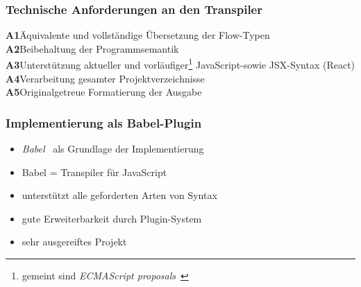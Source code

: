     \begin{frame}
      \frametitle{Technische Anforderungen an den Transpiler}
      \textbf{A1}\hspace{0.75em}Äquivalente und vollständige Übersetzung der Flow-Typen\\[.6em]
      \textbf{A2}\hspace{0.75em}Beibehaltung der Programmsemantik\\[.6em]
      \textbf{A3}\hspace{0.75em}Unterstützung aktueller und vorläufiger\footnote{gemeint sind \textit{ECMAScript proposals}~\autocite{ES_PROPOSALS}} JavaScript-\secframebr sowie JSX-Syntax (React)\\[.6em]
      \textbf{A4}\hspace{0.75em}Verarbeitung gesamter Projektverzeichnisse\\[.6em]
      \textbf{A5}\hspace{0.75em}Originalgetreue Formatierung der Ausgabe
    \end{frame}


    \begin{frame}
      \frametitle{Implementierung als Babel-Plugin}
      \begin{itemize}
        \item \textit{Babel}~\autocite{BABEL} als Grundlage der Implementierung
        \item Babel = Transpiler für JavaScript
        \item unterstützt alle geforderten Arten von Syntax
        \item gute Erweiterbarkeit durch Plugin-System
        \item sehr ausgereiftes Projekt
      \end{itemize}
    \end{frame}

